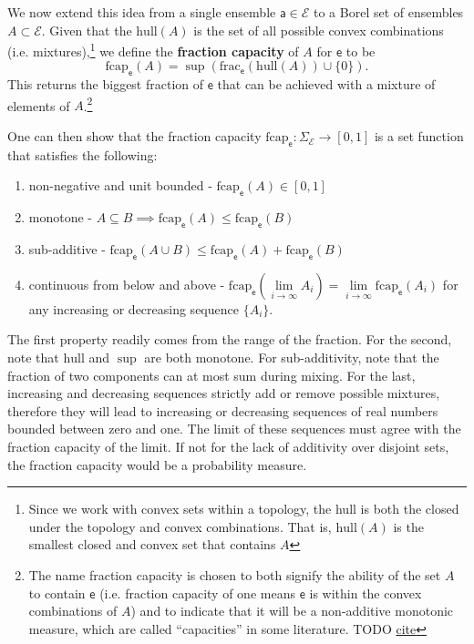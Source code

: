 \documentclass[10pt,twocolumn, nofootinbib]{revtex4-2}
\newcommand\hull{\mathrm{hull}}
\newcommand\fraction{\mathrm{frac}}
\newcommand\frcap{\mathrm{fcap}}
\newcommand{\ens}[1][e] {\mathsf{#1}} %
\newcommand{\Ens}[1][E] {\mathcal{#1}} %
\begin{document}
We now extend this idea from a single ensemble $\ens[a] \in \Ens$ to a Borel set of ensembles $A \subset \Ens$. Given that the $\hull(A)$ is the set of all possible convex combinations (i.e. mixtures),\footnote{Since we work with convex sets within a topology, the hull is both the closed under the topology and convex combinations. That is, $\hull(A)$ is the smallest closed and convex set that contains $A$} we define the \textbf{fraction capacity} of $A$ for $\ens$ to be
\begin{equation}
	\frcap_{\ens}(A) = \sup(\fraction_{\ens}(\hull(A))\cup\{0\}).
\end{equation}
This returns the biggest fraction of $\ens$ that can be achieved with a mixture of elements of $A$.\footnote{The name fraction capacity is chosen to both signify the ability of the set $A$ to contain $\ens$ (i.e. fraction capacity of one means $\ens$ is within the convex combinations of $A$) and to indicate that it will be a non-additive monotonic measure, which are called ``capacities'' in some literature. TODO \href{ https://link.springer.com/book/10.1007/978-3-319-03155-2}{cite} }

One can then show that the fraction capacity $\frcap_{\ens} : \Sigma_{\Ens} \to [0,1]$ is a set function that satisfies the following:
\begin{enumerate}
	\item non-negative and unit bounded - $\frcap_{\ens}(A) \in [0,1]$
	\item monotone - $A \subseteq B \implies \frcap_{\ens}(A) \leq \frcap_{\ens}(B)$
	\item sub-additive - $\frcap_{\ens}(A \cup B) \leq \frcap_{\ens}(A) + \frcap_{\ens}(B)$
	\item continuous from below and above - $\frcap_{\ens}(\lim\limits_{i \to \infty} A_i) = \lim\limits_{i \to \infty} \frcap_{\ens}(A_i)$ for any increasing or decreasing sequence $\{A_i\}$.
\end{enumerate}

The first property readily comes from the range of the fraction. For the second, note that $\hull$ and $\sup$ are both monotone. For sub-additivity, note that the fraction of two components can at most sum during mixing. For the last, increasing and decreasing sequences strictly add or remove possible mixtures, therefore they will lead to increasing or decreasing sequences of real numbers bounded between zero and one. The limit of these sequences must agree with the fraction capacity of the limit. If not for the lack of additivity over disjoint sets, the fraction capacity would be a probability measure.
\end{document}
